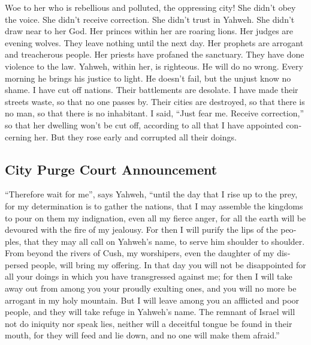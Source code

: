 \begin{paracol}{2}
\begin{otherlanguage}{english}
 Woe to her who is rebellious and polluted, the oppressing
city!  She didn't obey the voice. She didn't receive
correction. She didn't trust in Yahweh. She didn't draw near to her God.
 Her princes within her are roaring lions. Her judges are
evening wolves. They leave nothing until the next day. 
Her prophets are arrogant and treacherous people. Her priests have
profaned the sanctuary. They have done violence to the law.
 Yahweh, within her, is righteous. He will do no wrong.
Every morning he brings his justice to light. He doesn't fail, but the
unjust know no shame.  I have cut off nations. Their
battlements are desolate. I have made their streets waste, so that no
one passes by. Their cities are destroyed, so that there is no man, so
that there is no inhabitant.  I said, ``Just fear me.
Receive correction,'' so that her dwelling won't be cut off, according
to all that I have appointed concerning her. But they rose early and
corrupted all their doings.

\hypertarget{city-purge-court-announcement}{%
\subsection{City Purge Court
Announcement}\label{city-purge-court-announcement}}

 ``Therefore wait for me'', says Yahweh, ``until the day
that I rise up to the prey, for my determination is to gather the
nations, that I may assemble the kingdoms to pour on them my
indignation, even all my fierce anger, for all the earth will be
devoured with the fire of my jealousy.  For then I will
purify the lips of the peoples, that they may all call on Yahweh's name,
to serve him shoulder to shoulder.  From beyond the
rivers of Cush, my worshipers, even the daughter of my dispersed people,
will bring my offering.  In that day you will not be
disappointed for all your doings in which you have transgressed against
me; for then I will take away out from among you your proudly exulting
ones, and you will no more be arrogant in my holy mountain.
 But I will leave among you an afflicted and poor people,
and they will take refuge in Yahweh's name.  The remnant
of Israel will not do iniquity nor speak lies, neither will a deceitful
tongue be found in their mouth, for they will feed and lie down, and no
one will make them afraid.''


\end{otherlanguage}
\end{paracol}
